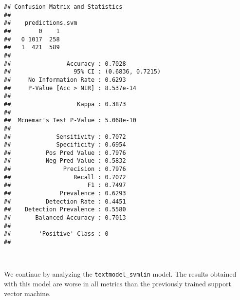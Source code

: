 \documentclass[
]{article}
\newenvironment{Shaded}{\begin{snugshade}}{\end{snugshade}}
\newcommand{\AttributeTok}[1]{\textcolor[rgb]{0.77,0.63,0.00}{#1}}
\newcommand{\DecValTok}[1]{\textcolor[rgb]{0.00,0.00,0.81}{#1}}
\newcommand{\FunctionTok}[1]{\textcolor[rgb]{0.00,0.00,0.00}{#1}}
\newcommand{\NormalTok}[1]{#1}
\newcommand{\OtherTok}[1]{\textcolor[rgb]{0.56,0.35,0.01}{#1}}
\newcommand{\SpecialCharTok}[1]{\textcolor[rgb]{0.00,0.00,0.00}{#1}}
\newcommand{\StringTok}[1]{\textcolor[rgb]{0.31,0.60,0.02}{#1}}
\begin{document}
\begin{Shaded}
\end{Shaded}

\begin{verbatim}
## Confusion Matrix and Statistics
## 
##    predictions.svm
##        0    1
##   0 1017  258
##   1  421  589
##                                           
##                Accuracy : 0.7028          
##                  95% CI : (0.6836, 0.7215)
##     No Information Rate : 0.6293          
##     P-Value [Acc > NIR] : 8.537e-14       
##                                           
##                   Kappa : 0.3873          
##                                           
##  Mcnemar's Test P-Value : 5.068e-10       
##                                           
##             Sensitivity : 0.7072          
##             Specificity : 0.6954          
##          Pos Pred Value : 0.7976          
##          Neg Pred Value : 0.5832          
##               Precision : 0.7976          
##                  Recall : 0.7072          
##                      F1 : 0.7497          
##              Prevalence : 0.6293          
##          Detection Rate : 0.4451          
##    Detection Prevalence : 0.5580          
##       Balanced Accuracy : 0.7013          
##                                           
##        'Positive' Class : 0               
## 
\end{verbatim}

~

We continue by analyzing the \texttt{textmodel\_svmlin} model. The
results obtained with this model are worse in all metrics than the
previously trained support vector machine.
\end{document}
